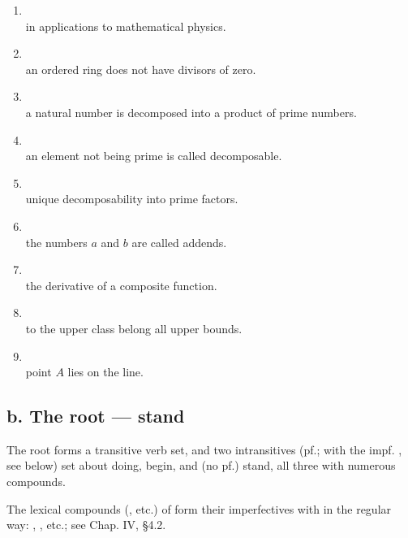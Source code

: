 \begin{enumerate}[label=\arabic*)]
      vector $b$ is attached to the end of vector $a$.
\item {}\\
      in applications to mathematical physics.
\item {}\\
      an ordered ring does not have divisors of zero.
\item {}\\
      a natural number is decomposed into a product of prime numbers.
\item {}\\
      an element not being prime is called decomposable.
\item {}\\
      unique decomposability into prime factors.
\item {}\\
      the numbers $a$ and $b$ are called addends.
\item {}\\
      the derivative of a composite function.
\item {}\\
      to the upper class belong all upper bounds.
\item {}\\
      point $A$ lies on the line.
\end{enumerate}

\subsection*{b. The root  --- stand}

The root  forms a transitive verb  set, and two intransitives  (pf.; with the impf. , see below) set about doing, begin, and  (no pf.) stand, all three with numerous compounds.

The lexical compounds (, etc.) of  form their imperfectives with  in the regular way: , , etc.; see Chap. IV, §4.2.

